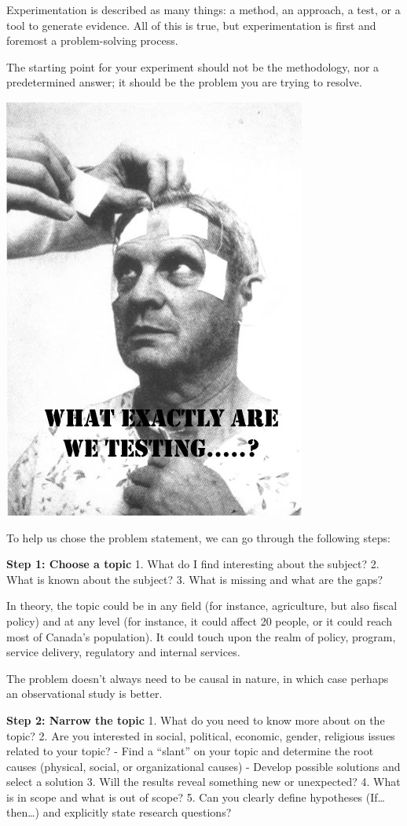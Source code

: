 \documentclass[openany]{book}
\begin{document}
Experimentation is described as many things: a method, an approach, a test, or a tool to generate evidence. All of this is true, but experimentation is first and foremost a problem-solving process.

The starting point for your experiment should not be the methodology, nor a predetermined answer; it should be the problem you are trying to resolve.

\includegraphics{fig/experiment-meme.jpg}

To help us chose the problem statement, we can go through the following steps:

\textbf{Step 1: Choose a topic}
1. What do I find interesting about the subject?
2. What is known about the subject?
3. What is missing and what are the gaps?

In theory, the topic could be in any field (for instance, agriculture, but also fiscal policy) and at any level (for instance, it could affect 20 people, or it could reach most of Canada's population). It could touch upon the realm of policy, program, service delivery, regulatory and internal services.

The problem doesn't always need to be causal in nature, in which case perhaps an observational study is better.

\textbf{Step 2: Narrow the topic}
1. What do you need to know more about on the topic?
2. Are you interested in social, political, economic, gender, religious issues related to your topic?
- Find a ``slant'' on your topic and determine the root causes (physical, social, or organizational causes)
- Develop possible solutions and select a solution
3. Will the results reveal something new or unexpected?
4. What is in scope and what is out of scope?
5. Can you clearly define hypotheses (If\ldots{}then\ldots{}) and explicitly state research questions?
\end{document}
